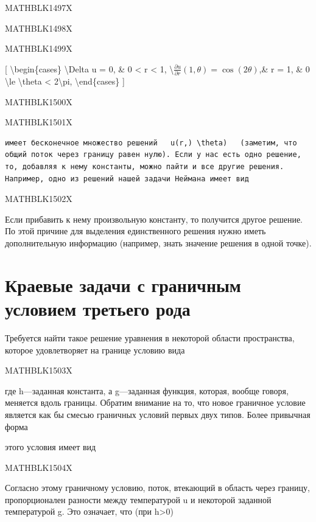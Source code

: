 \documentclass[
]{article}
\begin{document}
{{{MATHBLK1497X

MATHBLK1498X

MATHBLK1499X

{[} \textbackslash begin\{cases\} \textbackslash Delta u = 0, \& 0
\textless{} r \textless{} 1,
\textbackslash{}\(\frac{\partial u}{\partial r}(1, \theta) = \cos(2\theta)\),\&
r = 1, \& 0 \textbackslash le \textbackslash theta \textless{}
2\textbackslash pi, \textbackslash end\{cases\} {]}

MATHBLK1500X

MATHBLK1501X

\begin{verbatim}
имеет бесконечное множество решений   u(r,) \theta)   (заметим, что общий поток через границу равен нулю). Если у нас есть одно решение, то, добавляя к нему константы, можно пайти и все другие решения. Например, одно из решений нашей задачи Неймана имеет вид
\end{verbatim}

MATHBLK1502X

Если прибавить к нему произвольную константу, то получится другое
решение. По этой причине для выделения единственного решения нужно иметь
дополнительную информацию (например, знать значение решения в одной
точке).

\section{\texorpdfstring{\textbf{Краевые задачи с граничным условием}
третьего
рода}{Краевые задачи с граничным условием третьего рода}}\label{ux43aux440ux430ux435ux432ux44bux435-ux437ux430ux434ux430ux447ux438-ux441-ux433ux440ux430ux43dux438ux447ux43dux44bux43c-ux443ux441ux43bux43eux432ux438ux435ux43c-ux442ux440ux435ux442ux44cux435ux433ux43e-ux440ux43eux434ux430}

Требуется найти такое решение уравнения в некоторой области
пространства, которое удовлетворяет на границе условию вида

MATHBLK1503X

где h---заданная константа, а g---заданная функция, которая, вообще
говоря, меняется вдоль границы. Обратим внимание на то, что новое
граничное условие является как бы смесью граничных условий первых двух
типов. Более привычная форма

этого условия имеет вид

MATHBLK1504X

Согласно этому граничному условию, поток, втекающий в область через
границу, пропорционален разности между температурой u и некоторой
заданной температурой g. Это означает, что (при h\textgreater0)

}}}
\end{document}
